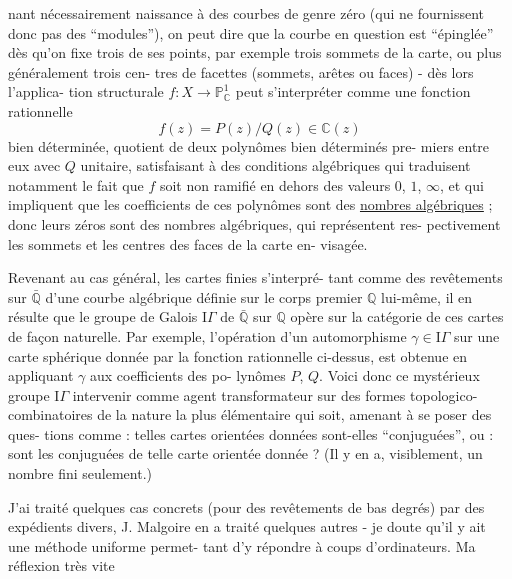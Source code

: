 
nant nécessairement naissance à des courbes de genre zéro (qui ne
fournissent donc pas des ``modules''), on peut dire que la courbe
en question est ``épinglée'' dès qu'on fixe trois de ses points, par
exemple trois sommets de la carte, ou plus généralement trois cen-%
tres de facettes (sommets, arêtes ou faces) - dès lors l'applica-%
tion structurale $f : X \to \mathbb{P}^{1}_{\mathbb{C}}$ peut s'interpréter comme une fonction
rationnelle
\[ f(z) = P(z)/Q(z) \in \mathbb{C}(z) \]
bien déterminée, quotient de deux polynômes bien déterminés pre-%
miers entre eux avec $Q$ unitaire, satisfaisant à des conditions
algébriques qui traduisent notamment le fait que $f$ soit non
ramifié en dehors des valeurs $0$, $1$, $\infty$, et qui impliquent que les
coefficients de ces polynômes sont des \uline{nombres algébriques} ; donc
leurs zéros sont des nombres algébriques, qui représentent res-%
pectivement les sommets et les centres des faces de la carte en-%
visagée.

Revenant au cas général, les cartes finies s'interpré-%
tant comme des revêtements sur $\bar{\mathbb{Q}}$ d'une courbe algébrique définie
sur le corps premier $\mathbb{Q}$ lui-même, il en résulte que le groupe de
Galois $\mathrm{I}\!\Gamma$ de $\bar{\mathbb{Q}}$ sur $\mathbb{Q}$ opère sur la catégorie de ces cartes de
façon naturelle. Par exemple, l'opération d'un automorphisme
$\gamma \in \mathrm{I}\!\Gamma$ sur une carte sphérique donnée par la fonction rationnelle
ci-dessus, est obtenue en appliquant $\gamma$ aux coefficients des po-%
lynômes $P$, $Q$. Voici donc ce mystérieux groupe $\mathrm{I}\!\Gamma$ intervenir comme
agent transformateur sur des formes topologico-combinatoires de la
nature la plus élémentaire qui soit, amenant à se poser des ques-%
tions comme : telles cartes orientées données sont-elles ``conjuguées'',
ou :  sont les conjuguées de telle carte orientée
donnée ? (Il y en a, visiblement, un nombre fini seulement.)

J'ai traité quelques cas concrets (pour des revêtements
de bas degrés) par des expédients divers, J. Malgoire en a traité
quelques autres - je doute qu'il y ait une méthode uniforme permet-%
tant d'y répondre à coups d'ordinateurs. Ma réflexion très vite

